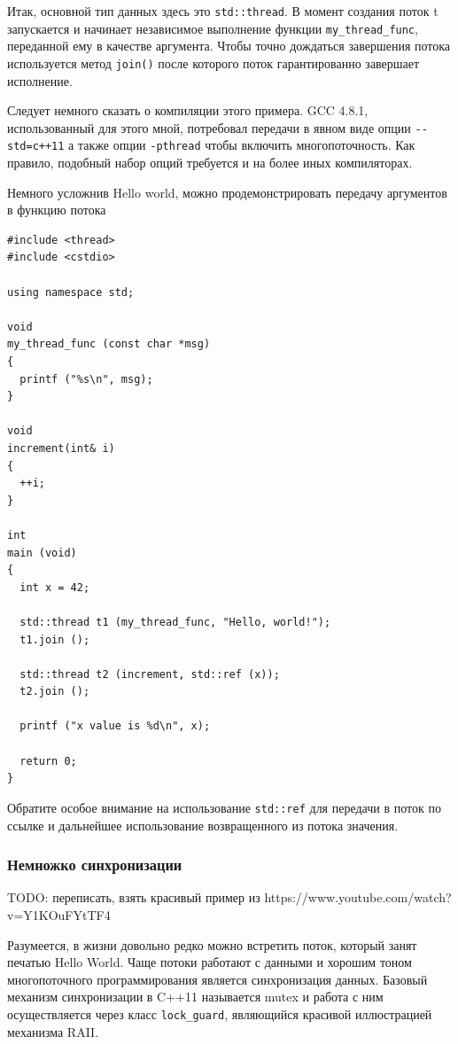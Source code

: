 \documentclass[a4paper,12pt,oneside]{article}
\begin{document}
Итак, основной тип данных здесь это \lstinline!std::thread!. В момент создания поток t запускается и начинает независимое выполнение функции \lstinline!my_thread_func!, переданной ему в качестве аргумента. Чтобы точно дождаться завершения потока используется метод \lstinline!join()! после которого поток гарантированно завершает исполнение.

Следует немного сказать о компиляции этого примера. GCC 4.8.1, использованный для этого мной, потребовал передачи в явном виде опции \lstinline!--std=c++11! а также опции \lstinline!-pthread! чтобы включить многопоточность. Как правило, подобный набор опций требуется и на более иных компиляторах.

Немного усложнив Hello world, можно продемонстрировать передачу аргументов в функцию потока

\begin{lstlisting}
#include <thread>
#include <cstdio>

using namespace std;

void 
my_thread_func (const char *msg)
{
  printf ("%s\n", msg);
}

void 
increment(int& i)
{
  ++i;
}

int 
main (void)
{
  int x = 42;

  std::thread t1 (my_thread_func, "Hello, world!");
  t1.join ();

  std::thread t2 (increment, std::ref (x));
  t2.join ();

  printf ("x value is %d\n", x);

  return 0;
}
\end{lstlisting}

Обратите особое внимание на использование \lstinline!std::ref! для передачи в поток по ссылке и дальнейшее использование возвращенного из потока значения.

\subsubsection{Немножко синхронизации}

TODO: переписать, взять красивый пример из https://www.youtube.com/watch?v=Y1KOuFYtTF4

Разумеется, в жизни довольно редко можно встретить поток, который занят печатью Hello World. Чаще потоки работают с данными и хорошим тоном многопоточного программирования является синхронизация данных. Базовый механизм синхронизации в C++11 называется mutex и работа с ним осуществляется через класс \lstinline!lock_guard!, являющийся красивой иллюстрацией механизма RAII.
\end{document}
